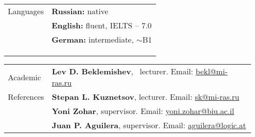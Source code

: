 \documentclass[letterpaper,11pt,oneside]{article}
\begin{document}
    \begin{tabular}{p{4cm} p{15cm}}
    \Large{Languages}
        & \textbf{Russian:} native \\
        & \textbf{English:} fluent, IELTS -- 7.0 \\
        & \textbf{German:} intermediate, $\sim$B1 \\
        & \\
                \\\\
            \end{tabular}
            \begin{tabular}{p{4cm} p{15cm}}
    \Large{Academic}   & \textbf{Lev D. Beklemishev}, \ lecturer. Email:  \href{mailto:bekl@mi-ras.ru }{bekl@mi-ras.ru } \\
    \Large{References} & \textbf{Stepan L. Kuznetsov}, lecturer. Email: \href{mailto:sk@mi-ras.ru}{sk@mi-ras.ru}\\
        & \textbf{Yoni Zohar}, \phantom{gggggggggg}supervisor. Email: \href{mailto:yoni.zohar@biu.ac.il }{yoni.zohar@biu.ac.il }\\
        & \textbf{Juan P. Aguilera}, \phantom{..ggg}supervisor. Email: \href{mailto:aguilera@logic.at}{aguilera@logic.at}
\end{tabular}

\newpage


\end{document}
